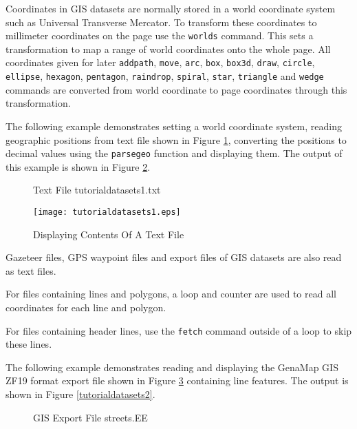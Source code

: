 Coordinates in GIS datasets are normally stored
in a world coordinate system such as
Universal Transverse Mercator.  To transform these coordinates to millimeter
coordinates on the page use the \texttt{worlds} command.  This sets a
transformation to map a range of world coordinates onto the whole page.  All
coordinates given for later \texttt{addpath}, \texttt{move}, \texttt{arc},
\texttt{box},
\texttt{box3d},
\texttt{draw},
\texttt{circle},
\texttt{ellipse},
\texttt{hexagon},
\texttt{pentagon},
\texttt{raindrop},
\texttt{spiral},
\texttt{star},
\texttt{triangle}
and
\texttt{wedge}
commands are converted from world coordinate to page coordinates
through this transformation.

The following example demonstrates
setting a world coordinate system,
reading geographic positions from text file shown in Figure
\ref{tutorialdatasets1txt}, converting the positions to decimal
values using the \texttt{parsegeo} function and displaying them.
The output of this example is shown in
Figure \ref{tutorialdatasets1}.

\begin{figure}[htb]

\caption{Text File tutorialdatasets1.txt}
\label{tutorialdatasets1txt}
\end{figure}



\begin{figure}[htb]
\texttt{[image: tutorialdatasets1.eps]}
\caption{Displaying Contents Of A Text File}
\label{tutorialdatasets1}
\end{figure}

Gazeteer files, GPS waypoint files and export files of GIS datasets
are also read as text files.

For files containing lines and polygons, a loop and counter
are used to read all coordinates for each line and polygon.

For files containing header lines, use the \texttt{fetch} command
outside of a loop to skip these lines.

The following example demonstrates
reading and displaying the GenaMap GIS ZF19 format export file shown in Figure
\ref{streetsEE} containing line
features.
The output is shown in Figure \ref{tutorialdatasets2}.

\begin{figure}[htb]

\caption{GIS Export File streets.EE}
\label{streetsEE}
\end{figure}

